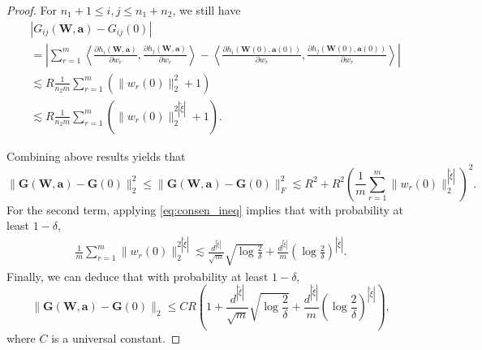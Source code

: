 \documentclass{article}
\begin{document}
\begin{proof}
    For $n_1 +1\le i, j\le n_1+n_2$, we  still have
	\begin{align*}
		&|G_{ij}(\mathbf{W}, \mathbf{a})-G_{ij}(0)|\\
		&= \left|\sum\limits_{r=1}^m \left\langle \frac{\partial h_i(\mathbf{W}, \mathbf{a})}{\partial w_r}, \frac{\partial h_j(\mathbf{W}, \mathbf{a})}{\partial w_r}\right\rangle-\left\langle \frac{\partial h_i(\mathbf{W}(0), \mathbf{a}(0))}{\partial w_r}, \frac{\partial h_j(\mathbf{W}(0), \mathbf{a}(0))}{\partial w_r}\right\rangle \right|\\
		&\lesssim R\frac{1}{n_2 m}\sum\limits_{r=1}^m(\|w_r(0)\|_2^{2}+1)\\
        &\lesssim R\frac{1}{n_2 m}\sum\limits_{r=1}^m(\|w_r(0)\|_2^{2|\tilde{\xi}|}+1).
	\end{align*}

	Combining above results yields that
	\begin{equation*}
		\|\mathbf{G}(\mathbf{W}, \mathbf{a})-\mathbf{G}(0)\|_2^2 \leq \|\mathbf{G}(\mathbf{W}, \mathbf{a})-\mathbf{G}(0)\|_F^2
		\lesssim R^2+R^2 \left(\frac{1 }{m}\sum\limits_{r=1}^m \|w_r(0)\|_2^{|\tilde{\xi}|}\right)^2.
	\end{equation*}
	For the second term, applying \cref{eq:consen_ineq} implies that with probability at least $1-\delta$,
	\begin{eqnarray}
        \frac{1 }{m}\sum\limits_{r=1}^m \|w_r(0)\|_2^{2|\tilde{\xi}|} \lesssim \frac{d^{|\tilde{\xi}|}}{\sqrt{m}} \sqrt{\log\frac{2}{\delta}} + \frac{d^{|\tilde{\xi}|}}{m}\left(\log\frac{2}{\delta}\right)^{|\tilde{\xi}|}.
    \end{eqnarray}
	Finally, we can deduce that with probability at least $1-\delta$,
    \begin{equation*}
        \|\mathbf{G}(\mathbf{W}, \mathbf{a})-\mathbf{G}(0)\|_2 \leq CR\left(1+\frac{d^{|\tilde{\xi}|}}{\sqrt{m}} \sqrt{\log\frac{2}{\delta}} + \frac{d^{|\tilde{\xi}|}}{m}\left(\log\frac{2}{\delta}\right)^{|\tilde{\xi}|}\right),
    \end{equation*}
	where $C$ is a universal constant.	
\end{proof}
\end{document}
